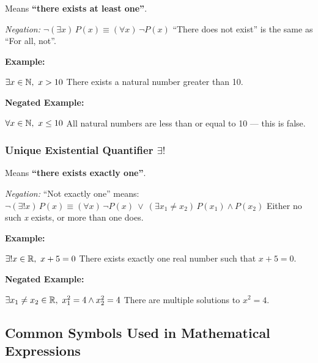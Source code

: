 Means \textbf{``there exists at least one''}.
 \vspace{\baselineskip}
			
\emph{Negation:}  \(\neg (\exists x)\,P(x) \equiv (\forall x)\, \neg P(x)\) ``There does not exist'' is 
the same as ``For all, not''.
\vspace{\baselineskip}

\textbf{Example:} 
\vspace{\baselineskip}

\(\exists x \in \mathbb{N},\ x > 10\) There exists a natural number greater than 10.
\vspace{\baselineskip}
			
\textbf{Negated Example:}  
\vspace{\baselineskip}

\(\forall x \in \mathbb{N},\ x \leq 10\) All natural numbers are less than or equal to 10 — this is false.

\subsubsection{Unique Existential Quantifier \texorpdfstring{\(\exists ! \)}{}} 
	
Means \textbf{``there exists exactly one''}.
\vspace{\baselineskip}
		
\emph{Negation:} ``Not exactly one'' means:
\(\neg (\exists! x)\, P(x) \equiv (\forall x)\, \neg P(x)\ \lor\ (\exists x_1 \neq x_2)\, P(x_1) \land 
P(x_2)\) Either no such \emph{x} exists, or more than one does.
\vspace{\baselineskip}

\textbf{Example:} 
\vspace{\baselineskip}

\(\exists! x \in \mathbb{R},\ x + 5 = 0\) There exists exactly one real number such that \( x + 5 = 0 \).
\vspace{\baselineskip}

\textbf{Negated Example:}  
\vspace{\baselineskip}

\(\exists x_1 \neq x_2 \in \mathbb{R},\ x_1^2 = 4 \land x_2^2 = 4\) There are multiple solutions to 
\( x^2 = 4 \).

\subsection{Common Symbols Used in Mathematical Expressions}

